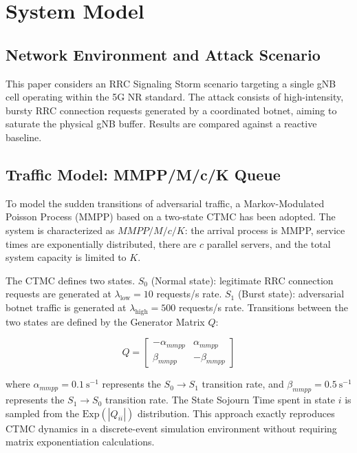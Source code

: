\documentclass[conference]{IEEEtran}
\begin{document}
\section{System Model}

\subsection{Network Environment and Attack Scenario}

This paper considers an RRC Signaling Storm scenario targeting a single gNB cell operating within the 5G NR standard. The attack consists of high-intensity, bursty RRC connection requests generated by a coordinated botnet, aiming to saturate the physical gNB buffer. Results are compared against a reactive baseline.

\subsection{Traffic Model: MMPP/M/c/K Queue}

To model the sudden transitions of adversarial traffic, a Markov-Modulated Poisson Process (MMPP) based on a two-state CTMC has been adopted. The system is characterized as $MMPP/M/c/K$: the arrival process is MMPP, service times are exponentially distributed, there are $c$ parallel servers, and the total system capacity is limited to $K$.

The CTMC defines two states. $S_0$ (Normal state): legitimate RRC connection requests are generated at $\lambda_{\mathrm{low}} = 10$ requests/s rate. $S_1$ (Burst state): adversarial botnet traffic is generated at $\lambda_{\mathrm{high}} = 500$ requests/s rate. Transitions between the two states are defined by the Generator Matrix $Q$:

\begin{equation}
Q = \begin{bmatrix}
    -\alpha_{mmpp} & \alpha_{mmpp} \\
    \beta_{mmpp}   & -\beta_{mmpp}
\end{bmatrix}
\label{eq:generator}
\end{equation}

\noindent where $\alpha_{mmpp} = 0.1\ \mathrm{s}^{-1}$ represents the $S_0 \to S_1$ transition rate, and $\beta_{mmpp} = 0.5\ \mathrm{s}^{-1}$ represents the $S_1 \to S_0$ transition rate. The State Sojourn Time spent in state $i$ is sampled from the $\mathrm{Exp}(|Q_{ii}|)$ distribution. This approach exactly reproduces CTMC dynamics in a discrete-event simulation environment without requiring matrix exponentiation calculations.
\end{document}
